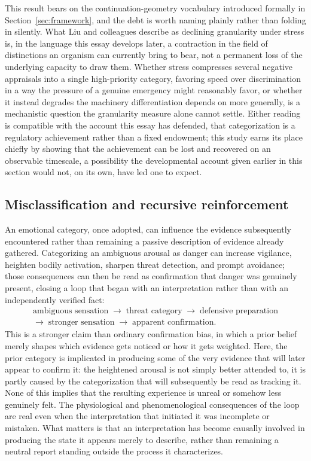 \documentclass[11pt]{article}
\begin{document}
This result bears on the continuation-geometry vocabulary introduced formally in Section~\ref{sec:framework}, and the debt is worth naming plainly rather than folding in silently. What Liu and colleagues describe as declining granularity under stress is, in the language this essay develops later, a contraction in the field of distinctions an organism can currently bring to bear, not a permanent loss of the underlying capacity to draw them. Whether stress compresses several negative appraisals into a single high-priority category, favoring speed over discrimination in a way the pressure of a genuine emergency might reasonably favor, or whether it instead degrades the machinery differentiation depends on more generally, is a mechanistic question the granularity measure alone cannot settle. Either reading is compatible with the account this essay has defended, that categorization is a regulatory achievement rather than a fixed endowment; this study earns its place chiefly by showing that the achievement can be lost and recovered on an observable timescale, a possibility the developmental account given earlier in this section would not, on its own, have led one to expect.

\subsection{Misclassification and recursive reinforcement}\label{sub:loop}

An emotional category, once adopted, can influence the evidence subsequently encountered rather than remaining a passive description of evidence already gathered. Categorizing an ambiguous arousal as danger can increase vigilance, heighten bodily activation, sharpen threat detection, and prompt avoidance; those consequences can then be read as confirmation that danger was genuinely present, closing a loop that began with an interpretation rather than with an independently verified fact:
\[
\begin{gathered}\text{ambiguous sensation} \;\rightarrow\; \text{threat category} \;\rightarrow\; \text{defensive preparation}\\ \rightarrow\; \text{stronger sensation} \;\rightarrow\; \text{apparent confirmation}.\end{gathered}
\]
This is a stronger claim than ordinary confirmation bias, in which a prior belief merely shapes which evidence gets noticed or how it gets weighted. Here, the prior category is implicated in producing some of the very evidence that will later appear to confirm it: the heightened arousal is not simply better attended to, it is partly caused by the categorization that will subsequently be read as tracking it. None of this implies that the resulting experience is unreal or somehow less genuinely felt. The physiological and phenomenological consequences of the loop are real even when the interpretation that initiated it was incomplete or mistaken. What matters is that an interpretation has become causally involved in producing the state it appears merely to describe, rather than remaining a neutral report standing outside the process it characterizes.
\end{document}
